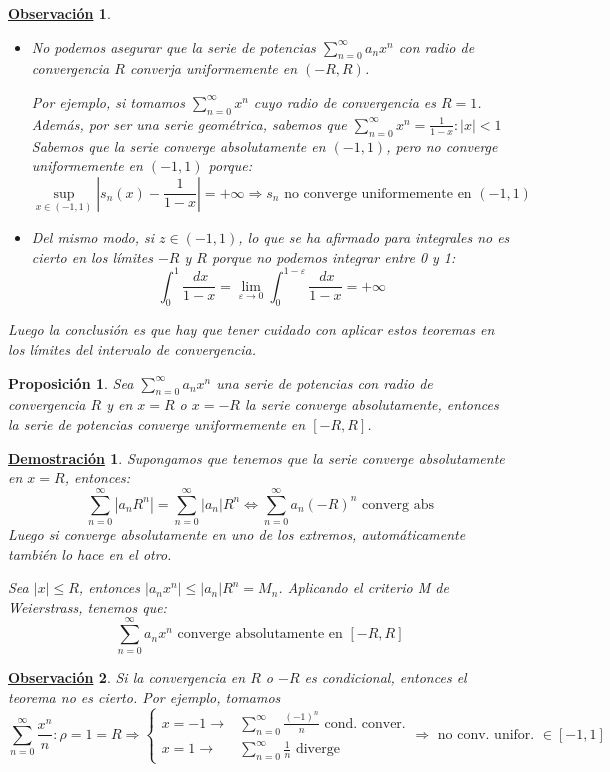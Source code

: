 \documentclass[10pt,a4paper,openright]{book}
\theoremstyle{break}
\newtheorem{prop}{Proposición}[chapter]
\newtheorem*{demo}{\underline{Demostración}}
\newtheorem{obs}{\underline{Observación}}[chapter]
\newcommand{\dif}[1]{\ d#1}
\begin{document}
\begin{obs}
\begin{itemize}
\item No podemos asegurar que la serie de potencias $\sum_{n= 0}^{\infty} a_n x^n $ con radio de convergencia $R$ converja uniformemente en $(-R,R)$.

Por ejemplo, si tomamos $\sum_{n= 0 }^{\infty} x^n$ cuyo radio de convergencia es $R = 1$. Además, por ser una serie geométrica, sabemos que $\sum_{n= 0 }^{\infty} x^n = \frac{1}{1-x} : |x| < 1$
Sabemos que la serie converge absolutamente en $(-1,1)$, pero no converge uniformemente en $(-1,1)$ porque:
$$\underset{x \in (-1,1)}{\sup} |s_n (x) - \frac{1}{1-x}| = + \infty \Rightarrow s_n  \mbox{ no converge uniformemente en }(-1,1)$$

\item Del mismo modo, si $z \in (-1,1)$, lo que se ha afirmado para integrales no es cierto en los límites $-R$ y $R$ porque no podemos integrar entre 0 y 1:
$$\int_{0}^{1} \frac{\dif{x}}{1-x} = \lim_{\varepsilon \to 0}  \int_{0}^{1-\varepsilon} \frac{\dif{x}}{1-x} = + \infty$$
\end{itemize}
Luego la conclusión es que hay que tener cuidado con aplicar estos teoremas en los límites del intervalo de convergencia.
\end{obs}

\begin{prop}
Sea $\sum_{n= 0}^{\infty} a_n x^n $ una serie de potencias con radio de convergencia $R$ y en $x = R$ o $x = -R$ la serie converge absolutamente, entonces la serie de potencias converge uniformemente en $[-R, R]$.
\end{prop}
\begin{demo}
Supongamos que tenemos que la serie converge absolutamente en $x = R$, entonces:
$$\sum_{n=0}^{\infty} |a_n R^n|= \sum_{n=0}^{\infty} |a_n| R^n \Leftrightarrow \sum_{n= 0}^{\infty} a_n(-R)^n \mbox{ converg abs}$$
Luego si converge absolutamente en uno de los extremos, automáticamente también lo hace en el otro.

Sea $|x| \leq R$, entonces $|a_n x^n| \leq |a_n| R^n = M_n$. Aplicando el criterio M de Weierstrass, tenemos que:
$$\sum_{n=0}^{\infty} a_n x^n \mbox{ converge absolutamente en } [-R,R]$$
\end{demo}

\begin{obs}
Si la convergencia en $R$ o $-R$ es condicional, entonces el teorema no es cierto. Por ejemplo, tomamos
$$\sum_{n= 0 }^{\infty} \frac{x^n}{n} : \rho = 1 = R \Rightarrow \begin{cases} x=-1 \rightarrow & \sum_{n=0}^{\infty} \frac{(-1)^n}{n} \mbox{ cond. conver.} \\ x=1 \rightarrow & \sum_{n=0}^{\infty} \frac{1}{n} \mbox{ diverge}\end{cases}\Rightarrow \mbox{ no conv. unifor. } \in [-1,1]$$
\end{obs}
\end{document}
